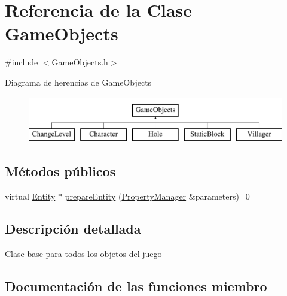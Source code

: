 \hypertarget{classGameObjects}{}\section{Referencia de la Clase Game\+Objects}
\label{classGameObjects}


{\ttfamily \#include $<$Game\+Objects.\+h$>$}

Diagrama de herencias de Game\+Objects\begin{figure}[H]
\begin{center}
\leavevmode
\includegraphics[height=2.000000cm]{classGameObjects}
\end{center}
\end{figure}
\subsection*{Métodos públicos}
\begin{DoxyCompactItemize}
\item 
virtual \hyperlink{classEntity}{Entity} $\ast$ \hyperlink{classGameObjects_ad8d8177b229922b5a29e7355c8cf54ca}{prepare\+Entity} (\hyperlink{classPropertyManager}{Property\+Manager} \&parameters)=0
\end{DoxyCompactItemize}


\subsection{Descripción detallada}
Clase base para todos los objetos del juego 

\subsection{Documentación de las funciones miembro}
\hypertarget{classGameObjects_ad8d8177b229922b5a29e7355c8cf54ca}{}
